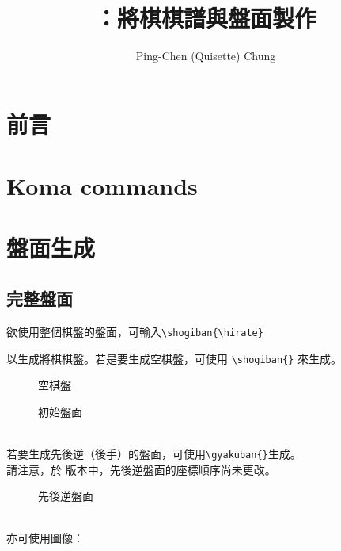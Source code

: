 \documentclass[a4paper, 10pt,]{article}
\begin{document}
\title{\RyuOhTeX：將棋棋譜與盤面製作}
\author{Ping-Chen (Quisette) Chung}

	\maketitle
	\tableofcontents

\setcounter{section}{-1}
\section{前言}
\newpage
\section{Koma commands}

\section{盤面生成}

\subsection{完整盤面}
欲使用整個棋盤的盤面，可輸入\verb|\shogiban{\hirate}|

以生成將棋棋盤。若是要生成空棋盤，可使用 \verb|\shogiban{}| 來生成。\\
\begin{figure}[h]
  \begin{minipage}[h]{0.5\linewidth}
    \centering
    \shogiban{}
    \caption{空棋盤}
    \label{fig:side:a}
  \end{minipage}%
  \begin{minipage}[h]{0.5\linewidth}
    \centering
    \shogiban{\hirate}
    \caption{初始盤面}
    \label{fig:side:b}
  \end{minipage}
\end{figure}\\
若要生成先後逆（後手）的盤面，可使用\verb|\gyakuban{}|生成。\\
請注意，於  版本中，先後逆盤面的座標順序尚未更改。
\begin{figure}[h]
    \centering
    \gyakuban{}
    \caption{先後逆盤面}
    \label{fig:my_label}
\end{figure}\\
亦可使用圖像：
\end{document}
